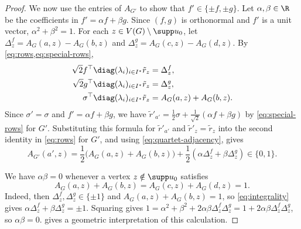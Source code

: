 \begin{proof}
  We now use the entries of $A_{G'}$ to show that $f'\in\{\pm f,\pm g\}$.
  Let $\alpha,\beta\in\R$ be the coefficients in $f'=\alpha f+\beta g$.
  Since $(f,g)$ is orthonormal and $f'$ is a unit vector,
  $\alpha^2+\beta^2=1$.
  For each $z\in V(G)\setminus\supp u_0$, let
  $\Delta_z^f=A_G(a,z)-A_G(b,z)$ and
  $\Delta_z^g=A_G(c,z)-A_G(d,z)$.
  By \cref{eq:rows,eq:special-rows},
  \begin{equation}\label{eq:quartet-adjacency}
    \begin{aligned}
      \sqrt2 f^{\top}\diag(\lambda_i)_{i\in I^*}\tilde{r}_z &= \Delta_z^f,\\
      \sqrt2 g^{\top}\diag(\lambda_i)_{i\in I^*}\tilde{r}_z &= \Delta_z^g,\\
      \sigma^{\top}\diag(\lambda_i)_{i\in I^*}\tilde{r}_z &= A_G(a,z)+A_G(b,z).
    \end{aligned}
  \end{equation}
  Since $\sigma'=\sigma$ and $f'=\alpha f+\beta g$, we have
  $\tilde{r}'_{a'}=\tfrac12\sigma+\tfrac1{\sqrt2}(\alpha f+\beta g)$
  by \cref{eq:special-rows} for $G'$.
  Substituting this formula for $\tilde{r}'_{a'}$ and $\tilde{r}'_z=\tilde{r}_z$ into
  the second identity in \cref{eq:rows} for $G'$, and using
  \cref{eq:quartet-adjacency}, gives
  \begin{equation}
    \label{eq:integrality}
    A_{G'}(a', z) = \frac{1}{2}\bigl(A_G(a,z)+A_G(b,z)\bigr)
      + \frac{1}{2}(\alpha\Delta_z^f+\beta\Delta_z^g)\in\{0,1\}.
  \end{equation}

  We have $\alpha\beta=0$ whenever a vertex $z\notin\supp u_0$ satisfies
  \begin{equation}\label{eq:quartet-probe}
    A_G(a,z)+A_G(b,z)=A_G(c,z)+A_G(d,z)=1.
  \end{equation}
  Indeed, then $\Delta_z^f,\Delta_z^g\in\{\pm1\}$ and
  $A_G(a,z)+A_G(b,z)=1$, so \cref{eq:integrality} gives
  $\alpha\Delta_z^f+\beta\Delta_z^g=\pm1$.
  Squaring gives
  $1=\alpha^2+\beta^2+2\alpha\beta\Delta_z^f\Delta_z^g
  =1+2\alpha\beta\Delta_z^f\Delta_z^g$, so $\alpha\beta=0$.
   gives a geometric interpretation of this calculation.

  


\end{proof}
